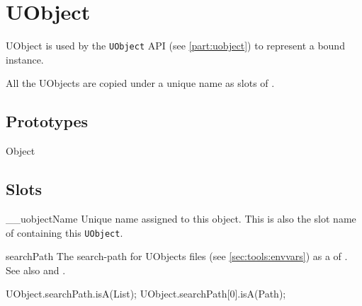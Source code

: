 
\section{UObject}

UObject is used by the \lstinline|UObject| API (see
\autoref{part:uobject}) to represent a bound \Cxx instance.

All the UObjects are copied under a unique name as slots of
.

\subsection{Prototypes}
\begin{refObjects}
\item[Object]
\end{refObjects}

\subsection{Slots}

\begin{urbiscriptapi}
\item[__uobjectName]%
  Unique name assigned to this object. This is also the slot name of
   containing this \lstinline|UObject|.


\item[searchPath] The search-path for UObjects files (see
  \autoref{sec:tools:envvars}) as a  of .
  See also  and .
\begin{urbiassert}
UObject.searchPath.isA(List);
UObject.searchPath[0].isA(Path);
\end{urbiassert}
\end{urbiscriptapi}

